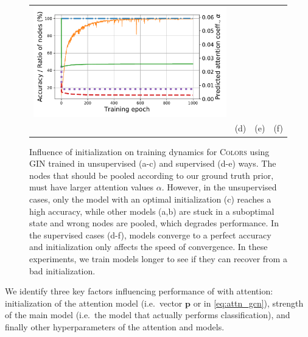 \begin{figure}[thb]
\begin{center}
\begin{small}
\begin{tabular}{cccc}
				{\includegraphics[width=\width, align=c, trim={0cm 0cm 0.5cm 0cm}, clip]{colors_init/optimal4_sup}} \\
				& (d) & (e) & (f) \\
			\end{tabular}
		\end{small}
		\vspace{-18pt}
	\end{center}
	\caption{\small Influence of initialization on training dynamics for \textsc{Colors} using GIN trained in unsupervised (a-c) and supervised (d-e) ways. The nodes that should be pooled according to our ground truth prior, must have larger attention values $\alpha$. However, in the unsupervised cases, only the model with an optimal initialization (c) reaches a high accuracy, while other models (a,b) are stuck in a suboptimal state and wrong nodes are pooled, which degrades performance. In the supervised cases (d-f), models converge to a perfect accuracy and initialization only affects the speed of convergence. In these experiments, we train models longer to see if they can recover from a bad initialization.}
	\label{fig:training_curves_unsup}
\end{figure}


We identify three key factors influencing performance of \gnns with attention: initialization of the attention model (i.e.~vector $\mathbf{p}$ or \gnn in \eqref{eq:attn_gcn}), strength of the main \gnn model (i.e.~the model that actually performs classification), and finally other hyperparameters of the attention and \gnn models.

